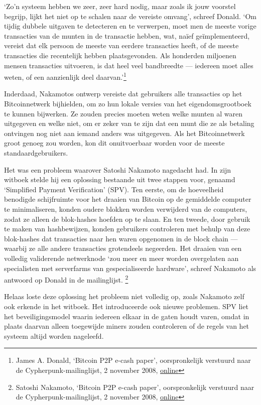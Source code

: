 \documentclass[
  a5paper,
  smalldemyvopaper,11pt,twoside,onecolumn,openright,extrafontsizes]{memoir}
\begin{document}
`Zo'n systeem hebben we zeer, zeer hard nodig, maar zoals ik jouw
voorstel begrijp, lijkt het niet op te schalen naar de vereiste omvang',
schreef Donald. `Om tijdig dubbele uitgaven te detecteren en te
verwerpen, moet men de meeste vorige transacties van de munten in de
transactie hebben, wat, naïef geïmplementeerd, vereist dat elk persoon
de meeste van eerdere transacties heeft, of de meeste transacties die
recentelijk hebben plaatsgevonden. Als honderden miljoenen mensen
transacties uitvoeren, is dat heel veel bandbreedte --- iedereen moet
alles weten, of een aanzienlijk deel daarvan.'\footnote{James A. Donald,
  `Bitcoin P2P e-cash paper', oorspronkelijk verstuurd naar de
  Cypherpunk-mailinglijst, 2 november 2008,
  \href{https://www.metzdowd.com/pipermail/cryptography/2008-November/014814.html}{online}}

Inderdaad, Nakamotos ontwerp vereiste dat gebruikers alle transacties op
het Bitcoinnetwerk bijhielden, om zo hun lokale versies van het
eigendomsgrootboek te kunnen bijwerken. Ze zouden precies moeten weten
welke munten al waren uitgegeven en welke niet, om er zeker van te zijn
dat een munt die ze als betaling ontvingen nog niet aan iemand anders
was uitgegeven. Als het Bitcoinnetwerk groot genoeg zou worden, kon dit
onuitvoerbaar worden voor de meeste standaardgebruikers.

Het was een probleem waarover Satoshi Nakamoto nagedacht had. In zijn
witboek stelde hij een oplossing bestaande uit twee stappen voor,
genaamd `Simplified Payment Verification' (SPV). Ten eerste, om de
hoeveelheid benodigde schijfruimte voor het draaien van Bitcoin op de
gemiddelde computer te minimaliseren, konden oudere blokken worden
verwijderd van de computers, zodat ze alleen de blok-hashes hoefden op
te slaan. En ten tweede, door gebruik te maken van hashbewijzen, konden
gebruikers controleren met behulp van deze blok-hashes dat transacties
naar hen waren opgenomen in de block chain --- waarbij ze alle andere
transacties grotendeels negeerden. Het draaien van een volledig
validerende netwerknode `zou meer en meer worden overgelaten aan
specialisten met serverfarms van gespecialiseerde hardware', schreef
Nakamoto als antwoord op Donald in de mailinglijst. \footnote{Satoshi
  Nakamoto, `Bitcoin P2P e-cash paper', oorspronkelijk verstuurd naar de
  Cypherpunk-mailinglijst, 2 november 2008,
  \href{https://www.metzdowd.com/pipermail/cryptography/2008-November/014815.html}{online}}

Helaas loste deze oplossing het probleem niet volledig op, zoals
Nakamoto zelf ook erkende in het witboek. Het introduceerde ook nieuwe
problemen. SPV liet het beveiligingsmodel waarin iedereen elkaar in de
gaten houdt varen, omdat in plaats daarvan alleen toegewijde miners
zouden controleren of de regels van het systeem altijd worden nageleefd.
\end{document}
